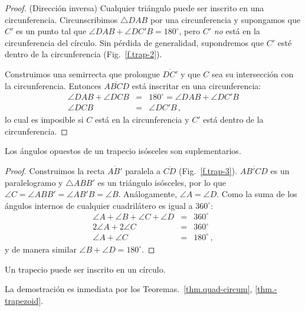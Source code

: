 \begin{proof}
(Dirección inversa)
Cualquier triángulo puede ser inscrito en una circunferencia. Circunscribimos $\triangle DAB$ por una circunferencia y supongamos que $C'$ es un punto tal que $\angle DAB + \angle DC'B = 180^\circ$, pero $C'$ \emph{no} está en la circunferencia del círculo. Sin pérdida de generalidad, supondremos que $C'$ esté dentro de la circunferencia (Fig.~\ref{f.trap-2}).

Construimos una semirrecta que prolongue $\overline{DC'}$ y que $C$ sea su intersección con la circunferencia. Entonces $\overline{ABCD}$ está inscritar en una circunferencia:
\begin{eqnarray*}
\angle DAB + \angle DCB &=&  180^\circ = \angle DAB + \angle DC'B\\
\angle DCB &=& \angle DC'B\,,
\end{eqnarray*}
lo cual es imposible si $C$ está en la circunferencia y $C'$ está dentro de la circunferencia.
\end{proof}

\begin{theorem}\label{thm.-trapezoid}
Los ángulos opuestos de un trapecio isósceles son suplementarios.
\end{theorem}
\begin{proof}
Construimos la recta $\overline{AB'}$ paralela a $\overline{CD}$ (Fig.~\ref{f.trap-3}). $\overline{AB'CD}$ es un paralelogramo y $\triangle ABB'$ es un triángulo isósceles, por lo que $\angle C= \angle ABB' = \angle AB'B = \angle B$. Análogamente, $\angle A = \angle D$. Como la suma de los ángulos internos de cualquier cuadrilátero es igual a $360^\circ$:
\begin{eqnarray*}
\angle A + \angle B + \angle C + \angle D &=& 360^\circ\\
2\angle A + 2 \angle C &=& 360^\circ\\
\angle A +  \angle C &=& 180^\circ\,,
\end{eqnarray*}
 y de manera similar $\angle B +  \angle D = 180^\circ$.
\end{proof}

\begin{theorem}
Un trapecio  puede ser inscrito en un círculo.
\end{theorem}
La demostración es inmediata por los Teoremas.~\ref{thm.quad-circum}, \ref{thm.-trapezoid}.

